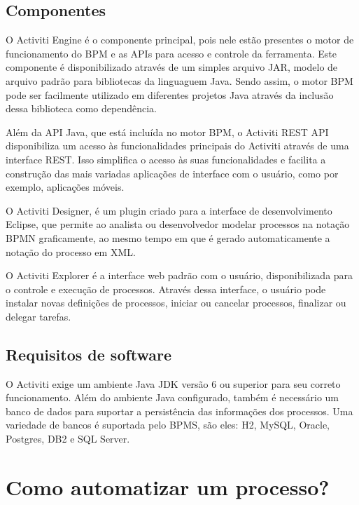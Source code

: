 \subsection{Componentes}\label{sec:automatizacao_processos-gestao_processos_componentes}

O Activiti Engine é o componente principal, pois nele estão presentes o motor de funcionamento do BPM e as APIs para acesso e controle da ferramenta. Este componente é disponibilizado através de um simples arquivo JAR, modelo de arquivo padrão para bibliotecas da linguaguem Java. Sendo assim, o motor BPM pode ser facilmente utilizado em diferentes projetos Java através da inclusão dessa biblioteca como dependência.

Além da API Java, que está incluída no motor BPM, o Activiti REST API disponibiliza um acesso às funcionalidades principais do Activiti através de uma interface REST. Isso simplifica o acesso às suas funcionalidades e facilita a construção das mais variadas aplicações de interface com o usuário, como por exemplo, aplicações móveis.

O Activiti Designer, é um plugin criado para a interface de desenvolvimento Eclipse, que permite ao analista ou desenvolvedor modelar processos na notação BPMN graficamente, ao mesmo tempo em que é gerado automaticamente a notação do processo em XML.

O Activiti Explorer é a interface web padrão com o usuário, disponibilizada para o controle e execução de processos. Através dessa interface, o usuário pode instalar novas definições de processos, iniciar ou cancelar processos, finalizar ou delegar tarefas.

\subsection{Requisitos de software}\label{sec:automatizacao_processos-gestao_processos_requisitos}

O Activiti exige um ambiente Java JDK versão 6 ou superior para seu correto funcionamento. Além do ambiente Java configurado, também é necessário um banco de dados para suportar a persistência das informações dos processos. Uma variedade de bancos é suportada pelo BPMS, são eles: H2, MySQL, Oracle, Postgres, DB2 e SQL Server.


\section{Como automatizar um processo?}\label{sec:automatizacao_processos-automatizar_processo}

